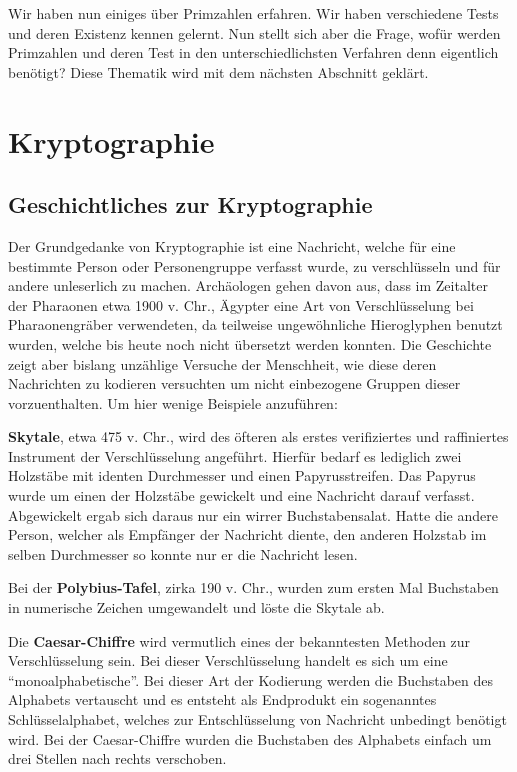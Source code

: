\documentclass[12pt,a4paper]{article}
\theoremstyle{definition}
\begin{document}
\newpage
Wir haben nun einiges über Primzahlen erfahren. Wir haben verschiedene Tests und deren Existenz kennen gelernt.
Nun stellt sich aber die Frage, wofür werden Primzahlen und deren Test in den unterschiedlichsten Verfahren denn eigentlich benötigt?
Diese Thematik wird mit dem nächsten Abschnitt geklärt.

\section{Kryptographie}\label{Kryptographie}

\subsection{Geschichtliches zur Kryptographie}\label{Geschichtliches zur Kryptographie}
Der Grundgedanke von Kryptographie ist eine Nachricht, welche für eine bestimmte Person oder Personengruppe verfasst wurde, zu verschlüsseln und für andere unleserlich zu machen.
Archäologen gehen davon aus, dass im Zeitalter der Pharaonen etwa 1900 v. Chr., Ägypter eine Art von Verschlüsselung bei Pharaonengräber verwendeten, da teilweise ungewöhnliche Hieroglyphen benutzt wurden, welche bis heute noch nicht übersetzt werden konnten.
Die Geschichte zeigt aber bislang unzählige Versuche der Menschheit, wie diese deren Nachrichten zu kodieren versuchten um nicht einbezogene Gruppen dieser vorzuenthalten.
Um hier wenige Beispiele anzuführen:

\textbf{Skytale}, etwa 475 v. Chr., wird des öfteren als erstes verifiziertes und raffiniertes Instrument der Verschlüsselung angeführt.
Hierfür bedarf es lediglich zwei  Holzstäbe mit identen Durchmesser und einen Papyrusstreifen.
Das Papyrus wurde um einen der Holzstäbe gewickelt und eine Nachricht darauf verfasst.
Abgewickelt ergab sich daraus nur ein wirrer Buchstabensalat.
Hatte die andere Person, welcher als Empfänger der Nachricht diente, den anderen Holzstab im selben Durchmesser so konnte nur er die Nachricht lesen.

Bei der \textbf{Polybius-Tafel}, zirka 190 v. Chr., wurden zum ersten Mal Buchstaben in numerische Zeichen umgewandelt und löste die Skytale ab.

Die \textbf{Caesar-Chiffre} wird vermutlich eines der bekanntesten Methoden zur Verschlüsselung sein.
Bei dieser Verschlüsselung handelt es sich um eine “monoalphabetische”.
Bei dieser Art der Kodierung werden die Buchstaben des Alphabets vertauscht und es entsteht als Endprodukt ein sogenanntes Schlüsselalphabet, welches zur Entschlüsselung von Nachricht unbedingt benötigt wird.
Bei der Caesar-Chiffre wurden die Buchstaben des Alphabets einfach um drei Stellen nach rechts verschoben.
\end{document}
